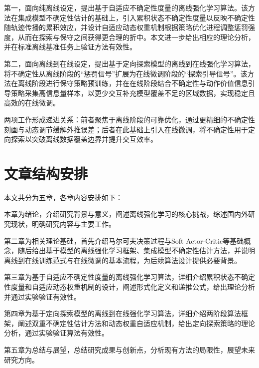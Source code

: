 第一，面向纯离线设定，提出基于自适应不确定性度量的离线强化学习算法。该方法在集成模型不确定性估计的基础上，引入累积状态不确定性度量以反映不确定性随轨迹传播的累积效应，并设计自适应动态权重机制根据策略优化进程调整惩罚强度，从而在探索与保守之间获得更合理的折中。本文进一步给出相应的理论分析，并在标准离线基准任务上验证方法有效性。

第二，面向离线到在线设定，提出基于定向探索模型的离线到在线强化学习算法，将不确定性从离线阶段的“惩罚信号”扩展为在线微调阶段的“探索引导信号”。该方法在离线阶段进行保守策略预训练，并在在线阶段结合不确定性与动作价值信息引导策略采集高信息量样本，以更少交互补充模型覆盖不足的区域数据，实现稳定且高效的在线微调。

两项工作形成递进关系：前者聚焦于离线阶段的可靠优化，通过更精细的不确定性刻画与动态调节缓解外推误差；后者在此基础上引入在线微调，将不确定性用于定向探索以突破离线数据覆盖边界并提升交互效率。


\section{文章结构安排}\label{Sec1.4}

本文共分为五章，各章内容安排如下：

本章为绪论，介绍研究背景与意义，阐述离线强化学习的核心挑战，综述国内外研究现状，明确研究内容与主要工作。

第二章为相关理论基础，首先介绍马尔可夫决策过程与Soft Actor-Critic等基础概念，随后给出基于模型的离线强化学习框架、集成模型不确定性估计方法，并说明离线到在线训练范式与在线微调的基本流程，为后续算法设计提供必要背景。

第三章为基于自适应不确定性度量的离线强化学习算法，详细介绍累积状态不确定性度量和自适应动态权重机制的设计，阐述形式化定义和递推公式，给出理论分析并通过实验验证有效性。

第四章为基于定向探索模型的离线到在线强化学习算法，详细介绍两阶段算法框架，阐述双重不确定性估计方法和动态权重自适应机制，给出定向探索策略的理论分析，通过实验验证算法有效性。

第五章为总结与展望，总结研究成果与创新点，分析现有方法的局限性，展望未来研究方向。

